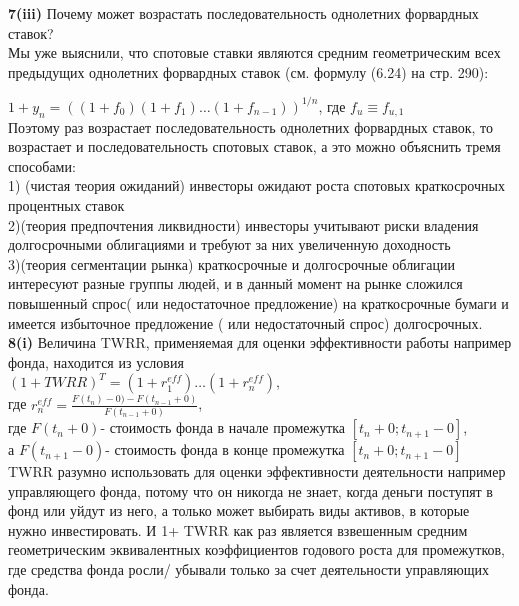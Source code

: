 \documentclass{article}
\begin{document}
{\bf \large  7(iii)}  Почему  может возрастать последовательность однолетних форвардных ставок?\\
Мы уже выяснили, что спотовые ставки являются средним геометрическим всех предыдущих однолетних форвардных ставок (см. формулу (6.24) на стр. 290):

$ \boxed { 1+y_n = ((1+f_0 )(1+f_1) \dots (1+f_{n-1}))^{1/n} }$, где $f_u  \equiv f_{u,1}$\\

Поэтому раз возрастает последовательность однолетних форвардных ставок, то возрастает и последовательность спотовых ставок, а это можно объяснить тремя способами:\\

1) (чистая теория ожиданий) инвесторы ожидают роста спотовых краткосрочных процентных ставок\\
2)(теория предпочтения ликвидности) инвесторы учитывают риски владения долгосрочными облигациями и требуют за них увеличенную доходность\\
3)(теория сегментации рынка) краткосрочные и долгосрочные облигации интересуют разные группы людей, и в данный момент на рынке сложился повышенный спрос( или недостаточное предложение)  на краткосрочные бумаги и имеется избыточное предложение ( или недостаточный спрос)  долгосрочных.\\


{\bf \large  8(i)} Величина TWRR, применяемая для оценки эффективности работы например фонда,  находится из условия\\

$  \boxed { (1+TWRR)^{T} = (1+r_1^{eff}) \dots (1+r_n^{eff}) } $, \\

 где $r_n^{eff} = \frac{ F(t_n)-0) - F(t_{n-1} +0) }{ F(t_{n-1} +0)}$, \\

где $F(t_n+0)$- стоимость фонда в начале промежутка $\left[ t_n+0; t_{n+1}-0\right]$, \\

а $F(t_{n+1}-0)$- стоимость фонда в конце промежутка $\left[ t_n+0; t_{n+1}-0\right]$\\

TWRR разумно использовать для оценки эффективности деятельности например управляющего фонда, 
потому что он никогда не знает, когда деньги поступят в фонд  или уйдут из него, а только может выбирать виды активов, в которые нужно инвестировать. 
И 1+ TWRR как раз  является взвешенным средним геометрическим эквивалентных коэффициентов годового роста для промежутков, где средства фонда росли/ убывали только за счет деятельности управляющих фонда.\\
\end{document}
